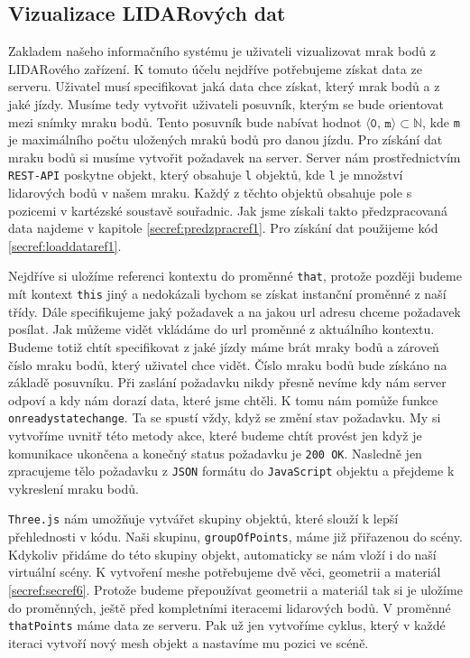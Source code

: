 \documentclass[czech,bachelor,dept420,male,cpdeclaration]{diploma}
\begin{document}
\subsection{Vizualizace LIDARových dat}  
Zakladem našeho informačního systému je uživateli vizualizovat mrak bodů z LIDARového zařízení. K tomuto účelu nejdříve potřebujeme získat data ze serveru. Uživatel musí specifikovat jaká data chce získat, který mrak bodů a z jaké jízdy. Musíme tedy vytvořit uživateli posuvník, kterým se bude orientovat mezi snímky mraku bodů. Tento posuvník bude nabívat hodnot 
$\langle \texttt{0, m}\rangle \subset \mathbb{N}$, kde \texttt{m} je maximálního počtu uložených mraků bodů pro danou jízdu. Pro získání dat mraku bodů si musíme vytvořit požadavek na server. Server nám prostřednictvím \texttt{REST-API} poskytne objekt, který obsahuje \texttt{l} objektů, kde \texttt{l} je množství lidarových bodů v našem mraku. Každý z těchto objektů obsahuje pole s pozicemi v kartézské soustavě souřadnic. Jak jsme získali takto předzpracovaná data najdeme v kapitole \ref{secref:predzpracref1}. Pro získání dat použijeme kód \ref{secref:loaddataref1}.



Nejdříve si uložíme referenci kontextu do proměnné \texttt{that}, protože později budeme mít kontext \texttt{this} jiný a nedokázali bychom se získat instanční proměnné z naší třídy. Dále specifikujeme jaký požadavek a na jakou url adresu chceme požadavek posílat. Jak můžeme vidět vkládáme do url proměnné z aktuálního kontextu. Budeme totiž chtít specifikovat z jaké jízdy máme brát mraky bodů a zároveň číslo mraku bodů, který uživatel chce vidět. Číslo mraku bodů bude získáno na základě posuvníku. Při zaslání požadavku nikdy přesně nevíme kdy nám server odpoví a kdy nám dorazí data, které jsme chtěli. K tomu nám pomůže funkce \texttt{onreadystatechange}. Ta se spustí vždy, když se změní stav požadavku. My si vytvoříme uvnitř této metody akce, které budeme chtít provést jen když je komunikace ukončena a konečný status požadavku je \texttt{200 OK}. Nasledně jen zpracujeme tělo požadavku z \texttt{JSON} formátu do \texttt{JavaScript} objektu a přejdeme k vykreslení mraku bodů.




\texttt{Three.js} nám umožňuje vytvářet skupiny objektů, které slouží k lepší přehlednosti v kódu. Naši skupinu, \texttt{groupOfPoints}, máme již přiřazenou do scény. Kdykoliv přidáme do této skupiny objekt, automaticky se nám vloží i do naší virtuální scény. K vytvoření meshe potřebujeme dvě věci, geometrii a materiál \ref{secref:secref6}. Protože budeme přepoužívat geometrii a materiál tak si je uložíme do proměnných, ještě před kompletními iteracemi lidarových bodů. V proměnné \texttt{thatPoints} máme data ze serveru. Pak už jen vytvoříme cyklus, který v každé iteraci vytvoří nový mesh objekt a nastavíme mu pozici ve scéně.
\end{document}
